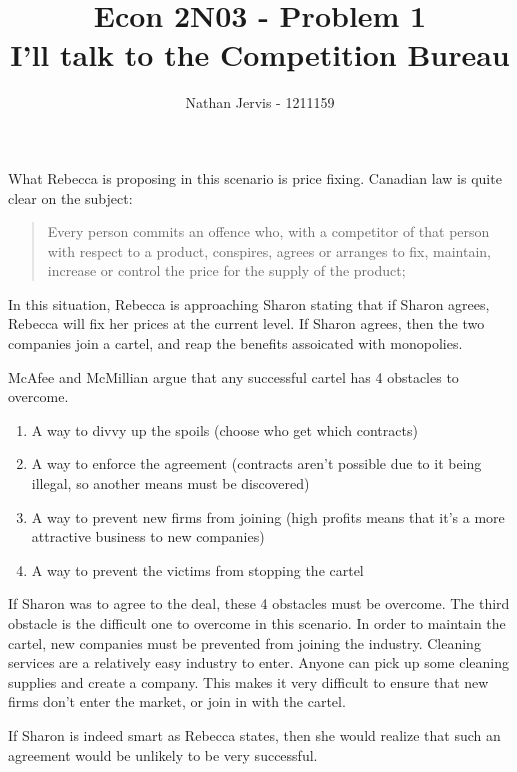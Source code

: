 \documentclass[12pt]{article}
\title{\vspace{-3.5cm}Econ 2N03 - Problem 1\\I'll talk to the Competition Bureau}
\author{Nathan Jervis - 1211159}
\begin{document}
\maketitle


What Rebecca is proposing in this scenario is price fixing. Canadian law is quite clear on the subject: \cite[45.1.a]{compAct}

\begin{quotation}
Every person commits an offence who, with a competitor of that person with respect to a product, conspires, agrees or arranges to fix, maintain, increase or control the price for the supply of the product;
\end{quotation}

In this situation, Rebecca is approaching Sharon stating that if Sharon agrees, Rebecca will fix her prices at the current level. If Sharon agrees, then the two companies join a cartel, and reap the benefits assoicated with monopolies.

McAfee and McMillian\cite[pg. 1]{biddingRings} argue that any successful cartel has 4 obstacles to overcome. 

\begin{enumerate}
\item A way to divvy up the spoils (choose who get which contracts)
\item A way to enforce the agreement (contracts aren't possible due to it being illegal, so another means must be discovered)
\item A way to prevent new firms from joining (high profits means that it's a more attractive business to new companies)
\item A way to prevent the victims from stopping the cartel
\end{enumerate}

If Sharon was to agree to the deal, these 4 obstacles must be overcome. The third obstacle is the difficult one to overcome in this scenario. In order to maintain the cartel, new companies must be prevented from joining the industry. Cleaning services are a relatively easy industry to enter. Anyone can pick up some cleaning supplies and create a company. This makes it very difficult to ensure that new firms don't enter the market, or join in with the cartel.

If Sharon is indeed smart as Rebecca states, then she would realize that such an agreement would be unlikely to be very successful.
\end{document}
